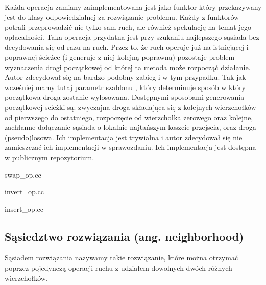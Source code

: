 \documentclass[polish,polish,a4paper]{article}
\begin{document}
Każda operacja zamiany zaimplementowana jest jako funktor który przekazywany jest do klasy odpowiedzialnej za rozwiązanie problemu.
Każdy z funktorów potrafi przeprowadzić nie tylko sam ruch, ale również spekulację na temat jego opłacalności. Taka operacja 
przydatna jest przy szukaniu najlepszego sąsiada bez decydowania się od razu na ruch. Przez to, że ruch operuje już na istniejącej
i poprawnej ścieżce (i generuje z niej kolejną poprawną) pozostaje problem wyznaczenia drogi początkowej od której ta metoda może
rozpocząć działanie. Autor zdecydował się na bardzo podobny zabieg i w tym przypadku. Tak jak wcześniej mamy tutaj parametr szablonu
, który determinuje sposób w który początkowa droga zostanie wylosowana. Dostępnymi sposobami generowania początkowej scieżki są:
zwyczajna droga składająca się z kolejnych wierzchołków od pierwszego do ostatniego, rozpoczęcie od wierzchołka zerowego oraz
kolejne, zachłanne dołączanie sąsiada o lokalnie najtańszym koszcie przejscia, oraz droga (pseudo)losowa. Ich implementacja jest
trywialna i autor zdecydował się nie zamieszczać ich implementacji w sprawozdaniu. Ich implementacja jest dostępna w publicznym
repozytorium.

\pagebreak

{swap_op.cc}

\pagebreak

{invert_op.cc}

\pagebreak

{insert_op.cc}

\subsection{Sąsiedztwo rozwiązania (ang. neighborhood)}
Sąsiadem rozwiązania nazywamy takie rozwiązanie, które można otrzymać poprzez pojedynczą operacji ruchu z udziałem dowolnych
dwóch różnych wierzchołków.
\end{document}
